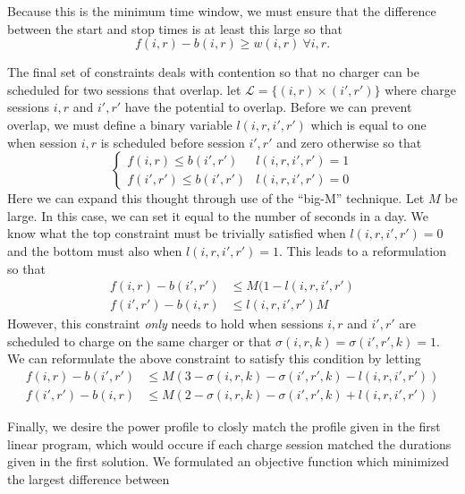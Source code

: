 \par Because this is the minimum time window, we must ensure that the difference between the start and stop times is at least this large so that
\begin{equation}\label{eqn:assignment:eqn4}
	f(i,r) - b(i,r) \ge w(i,r) \ \forall i,r.
\end{equation}
\par The final set of constraints deals with contention so that no charger can be scheduled for two sessions that overlap. let $\mathcal{L} = \{(i,r)\times (i',r') \}$ where charge sessions $i,r$ and $i',r'$ have the potential to overlap. Before we can prevent overlap, we must define a binary variable $l(i,r,i',r')$ which is equal to one when session $i,r$ is scheduled before session $i',r'$ and zero otherwise so that
\begin{equation}
	\begin{cases}
		f(i,r) \le b(i',r') & l(i,r,i',r') = 1 \\
		f(i',r') \le b(i',r') & l(i,r,i',r') = 0 
	\end{cases}
\end{equation}
Here we can expand this thought through use of the ``big-M'' technique.  Let $M$ be large. In this case, we can set it equal to the number of seconds in a day. We know what the top constraint must be trivially satisfied when $l(i,r,i',r') = 0$ and the bottom must also when $l(i,r,i',r') = 1$.  This leads to a reformulation so that
\begin{equation*}\begin{aligned}
		f(i,r) - b(i',r') & \le M(1 - l(i,r,i',r')\\
		f(i',r') - b(i,r) & \le l(i,r,i',r')M  
\end{aligned}\end{equation*}
However, this constraint {\it only} needs to hold when sessions $i,r$ and $i',r'$ are scheduled to charge on the same charger or that $\sigma(i,r,k) = \sigma(i',r',k) = 1$. We can reformulate the above constraint to satisfy this condition by letting
\begin{equation}\label{eqn:assignment:eqn5}\begin{aligned}
	f(i,r) - b(i',r') & \le M(3 - \sigma(i,r,k) - \sigma(i',r',k) - l(i,r,i',r')) \\
	f(i',r') - b(i,r) & \le M(2 - \sigma(i,r,k) - \sigma(i',r',k) + l(i,r,i',r'))
\end{aligned}\end{equation}
\par Finally, we desire the power profile to closly match the profile given in the first linear program, which would occure if each charge session matched the durations given in the first solution. We formulated an objective function which minimized the largest difference between 
